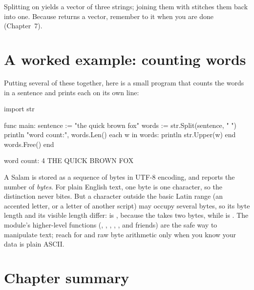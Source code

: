 Splitting  on  yields a vector of three
strings; joining them with  stitches them back into one. Because
 returns a vector, remember to  it when you are done
(Chapter~7).

\section{A worked example: counting words}

Putting several of these together, here is a small program that counts the words
in a sentence and prints each on its own line:

\begin{salamen}
import str

func main:
    sentence := "the quick brown fox"
    words := str.Split(sentence, " ")
    println "word count:", words.Len()
    each w in words:
        println str.Upper(w)
    end
    words.Free()
end
\end{salamen}

\begin{progout}
word count: 4
THE
QUICK
BROWN
FOX
\end{progout}

\begin{deep}
A Salam  is stored as a sequence of bytes in UTF-8 encoding, and
 reports the number of \emph{bytes}. For plain English text, one byte
is one character, so the distinction never bites. But a character outside the
basic Latin range (an accented letter, or a letter of another script) may
occupy several bytes, so its byte length and its visible length differ:
 is , because the  takes two bytes, while
 is .
The  module's higher-level functions (, ,
, , , and friends) are the safe way to
manipulate text; reach for  and raw byte arithmetic only when you know
your data is plain ASCII.
\end{deep}

\section{Chapter summary}


